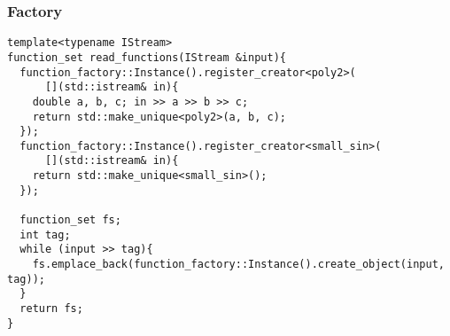 \begin{frame}[fragile]
  \frametitle{Factory} 
  \begin{verbatim}
template<typename IStream>
function_set read_functions(IStream &input){
  function_factory::Instance().register_creator<poly2>(
      [](std::istream& in){
    double a, b, c; in >> a >> b >> c; 
    return std::make_unique<poly2>(a, b, c);
  });
  function_factory::Instance().register_creator<small_sin>(
      [](std::istream& in){
    return std::make_unique<small_sin>();
  });
  
  function_set fs;
  int tag;
  while (input >> tag){
    fs.emplace_back(function_factory::Instance().create_object(input, tag));
  }
  return fs;
}
  \end{verbatim}
\end{frame}